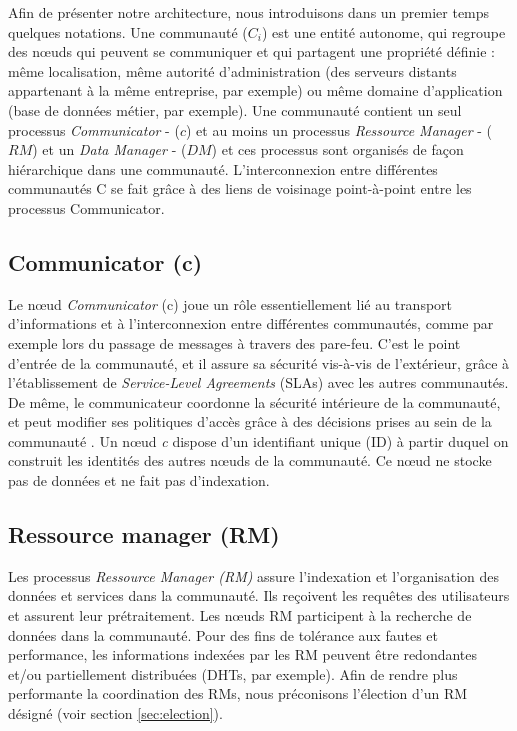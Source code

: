 Afin de présenter notre architecture, nous introduisons dans un premier temps quelques notations. Une communauté ($C_i$) est une entité autonome, qui regroupe des n{\oe}uds qui peuvent se communiquer et qui partagent une propriété définie : même localisation, même autorité d'administration (des serveurs distants appartenant à la même entreprise, par exemple) ou même domaine d'application (base de données métier, par exemple). Une communauté contient un seul processus \textit{Communicator} - ($c$) et au moins un processus \textit{Ressource Manager} - ($RM$) et un \textit{Data Manager} - ($DM$) et ces processus sont organisés de façon hiérarchique dans une communauté. L'interconnexion entre différentes communautés C se fait grâce à des liens de voisinage point-à-point entre les processus Communicator.

\subsection*{Communicator (c)}
Le n{\oe}ud \textit{Communicator} (c) joue un rôle essentiellement lié au transport d'informations et à l'interconnexion entre différentes communautés, comme par exemple lors du passage de messages à travers des pare-feu. C'est le point d'entrée de la communauté, et il assure sa sécurité vis-à-vis de l'extérieur, grâce à l'établissement de \textit{Service-Level Agreements} (SLAs) avec les autres communautés. De même, le communicateur coordonne la sécurité intérieure de la communauté, et peut modifier ses politiques d'accès grâce à des décisions prises au sein de la communauté \cite{Steffenel12a}. Un n{\oe}ud \textit{c} dispose d'un identifiant unique (ID) à partir duquel on construit les identités des autres n{\oe}uds de la communauté. Ce n{\oe}ud ne stocke pas de données et ne fait pas d'indexation.

\subsection*{Ressource manager (RM)} 
Les processus \textit{Ressource Manager (RM)} assure l'indexation et l'organisation des données et services dans la communauté. Ils reçoivent les requêtes des utilisateurs et assurent leur prétraitement. Les n{\oe}uds RM participent à la recherche de données dans la communauté. Pour des fins de tolérance aux fautes et performance, les informations indexées par les RM peuvent être redondantes et/ou partiellement distribuées (DHTs, par exemple). Afin de rendre plus performante la coordination des RMs, nous préconisons l'élection d'un RM désigné (voir section \ref{sec:election}).

